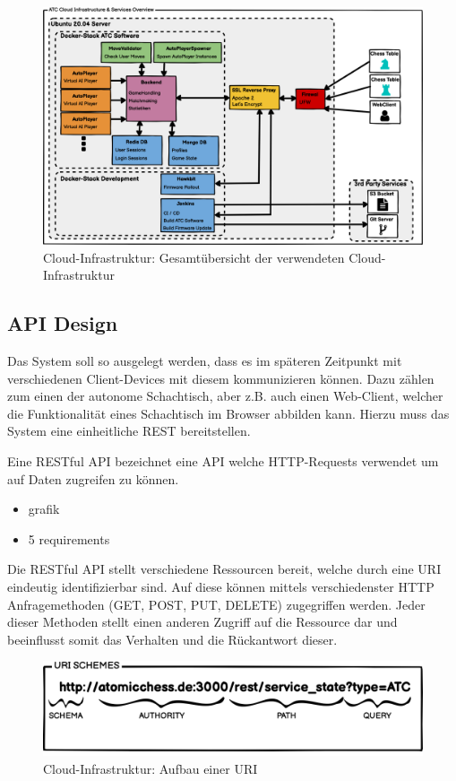 \begin{figure}
\centering
\includegraphics{images/ATC_Cloud_Architecture.png}
\caption{Cloud-Infrastruktur: Gesamtübersicht der verwendeten
Cloud-Infrastruktur}
\end{figure}

\hypertarget{api-design}{%
\subsection{API Design}\label{api-design}}

Das System soll so ausgelegt werden, dass es im späteren Zeitpunkt mit
verschiedenen Client-Devices mit diesem kommunizieren können. Dazu
zählen zum einen der autonome Schachtisch, aber z.B. auch einen
Web-Client, welcher die Funktionalität eines Schachtisch im Browser
abbilden kann. Hierzu muss das System eine einheitliche REST
bereitstellen.

Eine RESTful API bezeichnet eine API welche HTTP-Requests verwendet um
auf Daten zugreifen zu können.

\begin{itemize}
\tightlist
\item
  grafik
\item
  5 requirements
\end{itemize}

Die RESTful API stellt verschiedene Ressourcen bereit, welche durch eine
URI eindeutig identifizierbar sind. Auf diese können mittels
verschiedenster HTTP Anfragemethoden (GET, POST, PUT, DELETE)
zugegriffen werden. Jeder dieser Methoden stellt einen anderen Zugriff
auf die Ressource dar und beeinflusst somit das Verhalten und die
Rückantwort dieser.

\begin{figure}
\centering
\includegraphics{images/ATC_URI_SCHEMES.png}
\caption{Cloud-Infrastruktur: Aufbau einer URI}
\end{figure}

